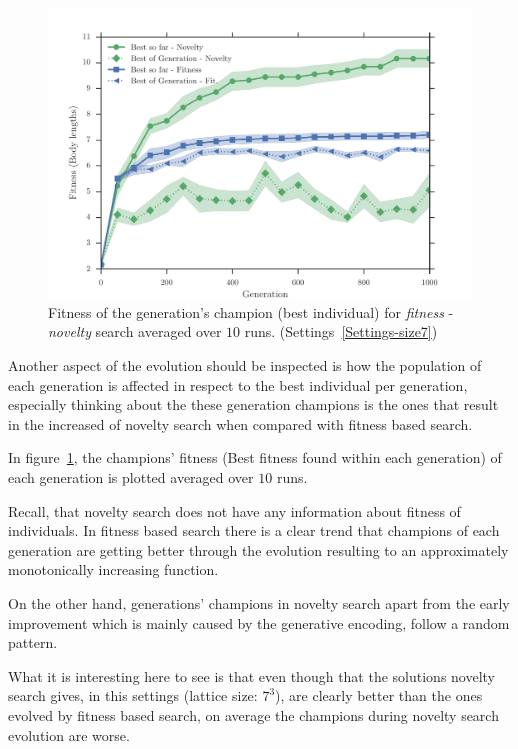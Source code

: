 \begin{figure}[t!]
\centering
\includegraphics[width=1.0\textwidth]{../Figures/Results/AvgGenerChampNoveltyFitnessSize7.pdf}
\caption{Fitness of the generation's champion (best individual) for \emph{fitness} - \emph{novelty} search averaged over $10$ runs. (Settings~\ref{Settings-size7})}
\label{fig:AvgGenerChampNoveltyFitnessSize7}
\end{figure}


Another aspect of the evolution should be inspected is how the population of each generation is affected in respect to the best individual per generation, especially thinking about the these generation champions is the ones that result in the increased of novelty search when compared with fitness based search.

In figure~\ref{fig:AvgGenerChampNoveltyFitnessSize7}, the champions' fitness (Best fitness found within each generation) of each generation is plotted averaged over $10$ runs.

Recall, that novelty search does not have any information about fitness of individuals. In fitness based search there is a clear trend that champions of each generation are getting better through the evolution resulting to an approximately monotonically increasing function.

On the other hand, generations' champions in novelty search apart from the early improvement which is mainly caused by the generative encoding, follow a random pattern.

What it is interesting here to see is that even though that the solutions novelty search gives, in this settings (lattice size: $7^3$), are clearly better than the ones evolved by fitness based search, on average the champions during novelty search evolution are worse.

